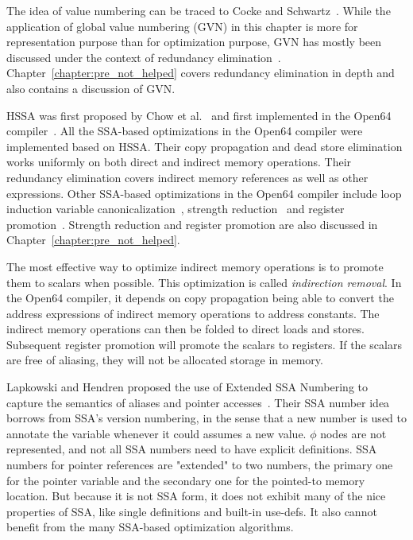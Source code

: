 The idea of value numbering can be traced to Cocke and Schwartz~\cite{CS70}.
While the application of global value numbering (GVN) in this chapter is more 
for representation purpose than for optimization purpose, GVN has mostly been
discussed under the context of redundancy elimination~\cite{Rosen88, Cli95}.
Chapter~\ref{chapter:pre_not_helped} covers redundancy elimination in
depth and also contains a discussion of GVN.

HSSA was first proposed by Chow {et al.}~\cite{hssa} and first implemented in
the Open64 compiler~\cite{amaral2001, Chan:2008:Tutorial, Chapman:2013:IJPP}.  All the 
SSA-based optimizations in the Open64 compiler were implemented based on HSSA.
Their copy propagation and dead store elimination 
works uniformly on both direct and indirect memory operations.
Their redundancy elimination covers indirect memory references as well as other
expressions.  Other SSA-based optimizations in the Open64 compiler include
loop induction variable canonicalization~\cite{Liu96},
strength reduction~\cite{Kennedy98} and register promotion~\cite{Lo98}.
Strength reduction and register promotion are also discussed in
Chapter~\ref{chapter:pre_not_helped}.  

The most effective way to optimize indirect memory operations is to promote them
to scalars when possible.  This optimization is called \emph{indirection 
removal}.  In the Open64 compiler, it depends on
copy propagation being able to convert the
address expressions of indirect memory operations to address constants.
The indirect memory operations can then be folded to direct loads and stores.
Subsequent register promotion will promote the scalars to registers.  If
the scalars are free of aliasing, they will not be allocated storage in memory.

Lapkowski and Hendren proposed the use of Extended SSA Numbering to capture
the semantics of aliases and pointer accesses~\cite{Lapkowski:1996:CASCON}.
Their SSA number idea borrows 
from SSA's version numbering, in the sense that a new number is used to 
annotate the variable whenever it could assumes a new value. $\phi$ nodes are
not represented, and not all SSA numbers need to have explicit definitions.
SSA numbers for pointer references are "extended" to two numbers, the primary 
one for the pointer variable and the secondary one for the pointed-to memory 
location.  But because it is not SSA form, it does not exhibit many of the nice
properties of SSA, like single definitions and built-in use-defs.  It also
cannot benefit from the many SSA-based optimization algorithms.

